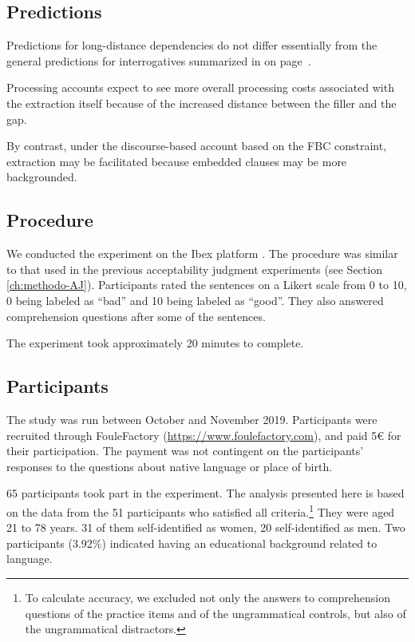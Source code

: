 \subsection{Predictions}

Predictions for long-distance dependencies do not differ essentially from the general predictions for interrogatives summarized in  on page~\pageref{tab:exp10-predictions}. 

Processing accounts expect to see more overall processing costs associated with the extraction itself because of the increased distance between the filler and the gap. 

By contrast, under the discourse-based account based on the FBC constraint, extraction may be facilitated because embedded clauses may be more backgrounded.

\subsection{Procedure} 

We conducted the experiment on the Ibex platform \citep{Ibex}. The procedure was similar to that used in the previous acceptability judgment experiments (see Section \ref{ch:methodo-AJ}). Participants rated the sentences on a Likert scale from 0 to 10, 0 being labeled as ``bad'' and 10 being labeled as ``good''. They also answered comprehension questions after some of the sentences.

The experiment took approximately 20 minutes to complete. 

\subsection{Participants}

The study was run between October and November 2019. 
Participants were recruited through FouleFactory (\url{https://www.foulefactory.com}), and paid 5€ for their participation. The payment was not contingent on the participants' responses to the questions about native language or place of birth.

65 participants took part in the experiment. 
The analysis presented here is based on the data from the 51 participants who satisfied all criteria.\footnote{To calculate accuracy, we excluded not only the answers to comprehension questions of the practice items and of the ungrammatical controls, but also of the ungrammatical distractors.}
They were aged 21 to 78 years. 31 of them self-identified as women, 20 self-identified as men. Two participants (3.92\%) indicated having an educational background related to language.

